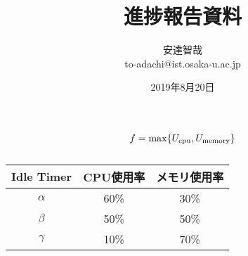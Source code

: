 \documentclass[a4j]{ujarticle}
\title{進捗報告資料}
\author{安達智哉\\to-adachi@ist.osaka-u.ac.jp}
\date{2019年8月20日}
\begin{document}
\maketitle

\begin{equation}
  f  = \max \{U_{\rm cpu}, U_{\rm memory} \}
  \label{eq:objective_function}
\end{equation}

\begin{table}[h]
 \caption{}
 \label{}
 \centering
  \begin{tabular}{ccc}
   \hline
   Idle Timer & CPU使用率 & メモリ使用率 \\
   \hline \hline
   $\alpha$ & 60\% & 30\% \\
   $\beta$ & 50\% & 50\% \\
   $\gamma$ & 10\% & 70\% \\
   \hline
  \end{tabular}
\end{table}



\end{document}
